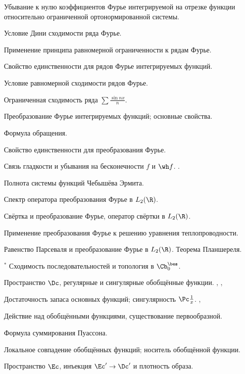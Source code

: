 \documentclass[a4paper]{article}
\begin{document}
\begin{nums}{-3}
\item Убывание к нулю коэффициентов Фурье интегрируемой на отрезке функции относительно
ограниченной ортонормированной системы.
\item Условие Дини сходимости ряда Фурье. \cite[8.1]{kf}
\item Применение принципа равномерной ограниченности к рядам Фурье. \cite[8.1]{kf}
\item Свойство единственности для рядов Фурье интегрируемых функций. \cite[7.1]{sh}
\item Условие равномерной сходимости рядов Фурье. \cite[8.1]{kf}
\item Ограниченная сходимость ряда $\sum\frac{\sin nx}{n}$. \cite[3.7]{hr}
\item Преобразование Фурье интегрируемых функций; основные свойства. \cite[8.4]{kf}
\item Формула обращения. \cite[8.4]{kf}
\item Свойство единственности для преобразования Фурье. \cite[8.4]{kf}
\item Связь гладкости и убывания на бесконечности $f$ и $\wh f$. \cite[8.4]{kf}.
\item Полнота системы функций Чебышёва Эрмита. \cite[8.4]{kf}
\item Спектр оператора преобразования Фурье в $L_2(\R)$.
\item Свёртка и преобразование Фурье, оператор свёртки в $L_2(\R)$.
\item Применение преобразования Фурье к решению уравнения теплопроводности. \cite[8.4]{kf}
\item Равенство Парсеваля и преобразование Фурье в $L_2(\R)$. Теорема Планшереля. \cite[8.5]{kf}
\item $^*$ Сходимость последовательностей и топология в $\Cb_0^\bes$.
\item Пространство $\Dc$, регулярные и сингулярные обобщённые функции. \cite{vl}, \cite{gs}, \cite{ru}
\item Достаточность запаса основных функций; сингулярность $\Pc\frac{1}{x}$. \cite{lec}, \cite{vl}
\item Действие над обобщёнными функциями, существование первообразной. \cite[1.2]{gs}
\item Формула суммирования Пуассона. \cite[1.2]{gs}
\item Локальное совпадение обобщённых функций; носитель обобщённой функции. \cite[6]{ru}
\item Пространство $\Ec$, инъекция $\Ec'\to \Dc'$ и плотность образа. \cite{lec}

\end{nums}
\end{document}
